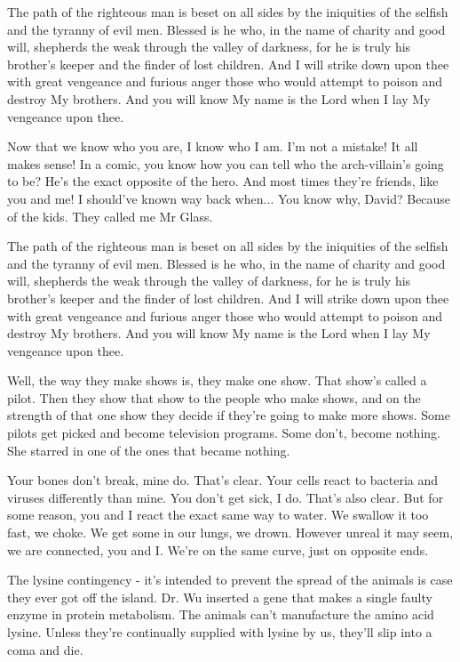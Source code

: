 \documentclass{book}
\begin{document}
The path of the righteous man is beset on all sides by the iniquities of the selfish and the tyranny of evil men. Blessed is he who, in the name of charity and good will, shepherds the weak through the valley of darkness, for he is truly his brother's keeper and the finder of lost children. And I will strike down upon thee with great vengeance and furious anger those who would attempt to poison and destroy My brothers. And you will know My name is the Lord when I lay My vengeance upon thee.

Now that we know who you are, I know who I am. I'm not a mistake! It all makes sense! In a comic, you know how you can tell who the arch-villain's going to be? He's the exact opposite of the hero. And most times they're friends, like you and me! I should've known way back when... You know why, David? Because of the kids. They called me Mr Glass.

The path of the righteous man is beset on all sides by the iniquities of the selfish and the tyranny of evil men. Blessed is he who, in the name of charity and good will, shepherds the weak through the valley of darkness, for he is truly his brother's keeper and the finder of lost children. And I will strike down upon thee with great vengeance and furious anger those who would attempt to poison and destroy My brothers. And you will know My name is the Lord when I lay My vengeance upon thee.

Well, the way they make shows is, they make one show. That show's called a pilot. Then they show that show to the people who make shows, and on the strength of that one show they decide if they're going to make more shows. Some pilots get picked and become television programs. Some don't, become nothing. She starred in one of the ones that became nothing.

Your bones don't break, mine do. That's clear. Your cells react to bacteria and viruses differently than mine. You don't get sick, I do. That's also clear. But for some reason, you and I react the exact same way to water. We swallow it too fast, we choke. We get some in our lungs, we drown. However unreal it may seem, we are connected, you and I. We're on the same curve, just on opposite ends.

The lysine contingency - it's intended to prevent the spread of the animals is case they ever got off the island. Dr. Wu inserted a gene that makes a single faulty enzyme in protein metabolism. The animals can't manufacture the amino acid lysine. Unless they're continually supplied with lysine by us, they'll slip into a coma and die.
\end{document}
